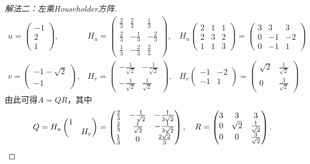 \documentclass[a4paper,fontset=windows]{ctexbook}
\theoremstyle{definition}
\begin{document}
\begin{proof}[解法二：左乘Householder方阵]
$$\begin{array}{lll}
u=\begin{pmatrix}-1 \\ 2 \\ 1\end{pmatrix}, &H_u=\begin{pmatrix}\frac{2}{3}&\frac{2}{3}&\frac{1}{3} \\ \frac{2}{3}&-\frac{1}{3}&-\frac{2}{3} \\ \frac{1}{3}&-\frac{2}{3}&\frac{2}{3}\end{pmatrix}, &H_u\begin{pmatrix}2&1&1 \\ 2&3&2 \\ 1&1&3\end{pmatrix}=\begin{pmatrix}3&3&3 \\ 0&-1&-2 \\ 0&-1&1\end{pmatrix} \\
v=\begin{pmatrix}-1-\sqrt{2} \\ -1\end{pmatrix}, &H_v=\begin{pmatrix}-\frac{1}{\sqrt{2}}&-\frac{1}{\sqrt{2}} \\ -\frac{1}{\sqrt{2}}&\frac{1}{\sqrt{2}}\end{pmatrix}, &H_v\begin{pmatrix}-1&-2 \\ -1&1\end{pmatrix}=\begin{pmatrix}\sqrt{2}&\frac{1}{\sqrt{2}} \\ 0&\frac{3}{\sqrt{2}}\end{pmatrix}
\end{array}$$
由此可得$A=QR$，其中
\begin{equation*}
Q=H_u\begin{pmatrix}1& \\ &H_v\end{pmatrix}=\begin{pmatrix}\frac{2}{3}&-\frac{1}{\sqrt{2}}&-\frac{1}{3\sqrt{2}} \\ \frac{2}{3}&\frac{1}{\sqrt{2}}&-\frac{1}{3\sqrt{2}} \\ \frac{1}{3}&0&\frac{2\sqrt{2}}{3}\end{pmatrix},\quad R=\begin{pmatrix}3&3&3 \\ 0&\sqrt{2}&\frac{1}{\sqrt{2}} \\ 0&0&\frac{3}{\sqrt{2}}\end{pmatrix}.\qedhere
\end{equation*}
\end{proof}
\end{document}

